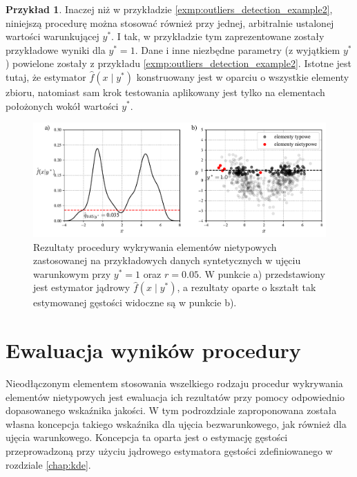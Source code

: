 \documentclass[12pt,a4paper,oneside]{book}
\theoremstyle{definition}
\newtheorem{exmp}{Przykład}[chapter]
\begin{document}
\begin{exmp}
Inaczej niż w przykładzie \ref{exmp:outliers_detection_example2}, niniejszą procedurę można stosować również przy jednej, arbitralnie ustalonej wartości warunkującej $y^*$. I tak, w przykładzie tym zaprezentowane zostały przykładowe wyniki dla $y^*=1$. Dane i inne niezbędne parametry (z wyjątkiem $y^*$) powielone zostały z przykładu \ref{exmp:outliers_detection_example2}. Istotne jest tutaj, że estymator $\hat{f}(x \mid y^*)$ konstruowany jest w oparciu o wszystkie elementy zbioru, natomiast sam krok testowania aplikowany jest tylko na elementach położonych wokół wartości $y^*$.
\begin{figure}[H]
    \centering
    \includegraphics[scale=0.6]{outliers_detection_example3}
    \vspace{-0.5cm} 
    \caption{Rezultaty procedury wykrywania elementów nietypowych zastosowanej na przykładowych danych syntetycznych w ujęciu warunkowym przy $y^*=1$ oraz $r=0.05$. W punkcie a) przedstawiony jest estymator jądrowy $\hat{f}(x \mid y^*)$, a rezultaty oparte o kształt tak estymowanej gęstości widoczne są w punkcie b).}
    \label{fig:outliers_detection_example3}
\end{figure}
\end{exmp}

\section{Ewaluacja wyników procedury}

Nieodłączonym elementem stosowania wszelkiego rodzaju procedur wykrywania elementów nietypowych jest ewaluacja ich rezultatów przy pomocy odpowiednio dopasowanego wskaźnika jakości. W tym podrozdziale zaproponowana została własna koncepcja takiego wskaźnika dla ujęcia bezwarunkowego, jak również dla ujęcia warunkowego. Koncepcja ta oparta jest o estymację gęstości przeprowadzoną przy użyciu jądrowego estymatora gęstości zdefiniowanego w rozdziale \ref{chap:kde}.
\end{document}
